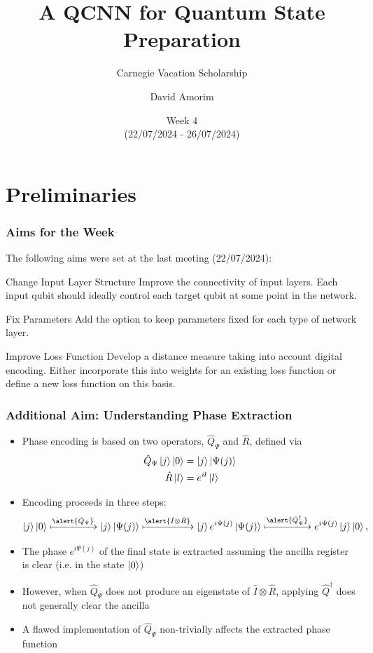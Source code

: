 \documentclass{beamer}
\title[QCNN State Preparation]{A QCNN for Quantum State Preparation}
\subtitle{Carnegie Vacation Scholarship}
\author[David Amorim]{David Amorim}
\institute[]{}
\date[29/07/2024]{Week 4 \\(22/07/2024 - 26/07/2024)}
\begin{document}
\frame{\titlepage}

\section{Preliminaries}
\begin{frame}
\frametitle{Aims for the Week}
The following aims were set at the last meeting (22/07/2024):

\begin{alertblock}{Change Input Layer Structure}
Improve the connectivity of input layers. Each input qubit should ideally control each target qubit at some point in the network. 
\end{alertblock}

\begin{alertblock}{Fix Parameters}
Add the option to keep parameters fixed for each type of network layer. 
\end{alertblock}

\begin{alertblock}{Improve Loss Function}
Develop a distance measure taking into account digital encoding. Either incorporate this into weights for an existing loss function or define a new loss function on this basis. 
\end{alertblock}
\end{frame}

\begin{frame}
\frametitle{Additional Aim: Understanding Phase Extraction}
\begin{itemize}
\item Phase encoding is based on two operators, \alert{$\hat{Q}_\Psi$ and $\hat{R}$}, defined via 
\begin{align}
\hat{Q}_\Psi \ket{j}\ket{0} &= \ket{j}\ket{\Psi(j)} \\
\hat{R} \ket{l} &= e^{i l} \ket{l}
\end{align}
\item Encoding proceeds in \alert{three steps}:
\begin{equation}
\ket{j}\ket{0}\xmapsto{\alert{\hat{Q}_\Psi}} \ket{j}\ket{\Psi(j)} \xmapsto{\alert{\hat{I} \otimes \hat{R}}} \ket{j} e^{i \Psi(j)} \ket{\Psi(j)} \xmapsto{\alert{\hat{Q}_\Psi^\dagger}} e^{i \Psi (j)} \ket{j} \ket{0}, 
\end{equation}
\item The phase $e^{i \Psi (j)}$ of the final state is extracted \alert{assuming the ancilla register is clear} (i.e. in the state $\ket{0}$)
\item However, when $\hat{Q}_\Psi$ does not produce an eigenstate of $\hat{I} \otimes \hat{R}$, applying $\hat{Q}^\dagger$ does not generally clear the ancilla
\item  A flawed implementation of $\hat{Q}_\Psi$ \alert{non-trivially affects the extracted phase function} 
\end{itemize}
\end{frame}
\end{document}

